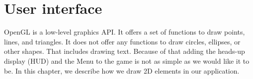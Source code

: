 \section{User interface} \label{sec:two_dimensional_graphics}
OpenGL is a low-level graphics API.
It offers a set of functions to draw points, lines, and triangles.
It does not offer any functions to draw circles, ellipses, or other shapes.
That includes drawing text.
Because of that adding the heads-up display (HUD) and the Menu to the game is not as simple as we would like it to be.
In this chapter, we describe how we draw 2D elements in our application.



